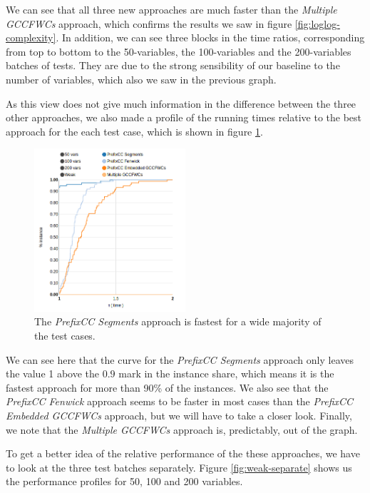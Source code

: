 \documentclass[a4paper,10pt]{article}
\begin{document}
We can see that all three new approaches are much faster than the \emph{Multiple GCCFWCs} approach, which confirms the results we saw in figure \ref{fig:loglog-complexity}. In addition, we can see three blocks in the time ratios, corresponding from top to bottom to the 50-variables, the 100-variables and the 200-variables batches of tests. They are due to the strong sensibility of our baseline to the number of variables, which also we saw in the previous graph.

As this view does not give much information in the difference between the three other approaches, we also made a profile of the running times relative to the best approach for the each test case, which is shown in figure \ref{fig:weak-all-time}.

\begin{figure}[h]
    \centering
    \includegraphics[width=0.5\textwidth]{img/weak-all-time}
    \caption{The \emph{PrefixCC Segments} approach is fastest for a wide majority of the test cases.}
    \label{fig:weak-all-time}
\end{figure}

We can see here that the curve for the \emph{PrefixCC Segments} approach only leaves the value 1 above the $0.9$ mark in the instance share, which means it is the fastest approach for more than 90\% of the instances. We also see that the \emph{PrefixCC Fenwick} approach seems to be faster in most cases than the \emph{PrefixCC Embedded GCCFWCs} approach, but we will have to take a closer look. Finally, we note that the \emph{Multiple GCCFWCs} approach is, predictably, out of the graph.

To get a better idea of the relative performance of the these approaches, we have to look at the three test batches separately. Figure \ref{fig:weak-separate} shows us the performance profiles for 50, 100 and 200 variables.
\end{document}
